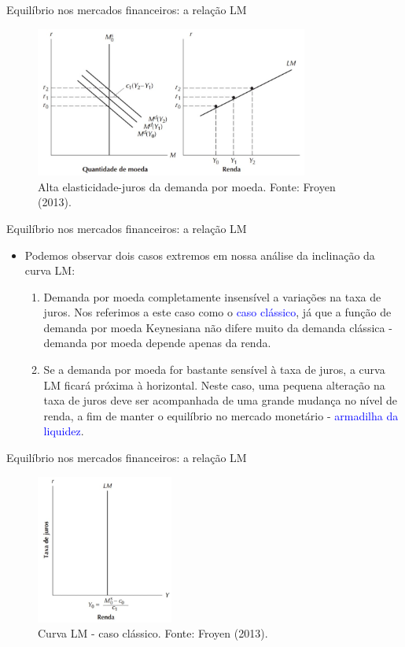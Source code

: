 \documentclass[10pt]{beamer}
\begin{document}
\begin{frame}{Equilíbrio nos mercados financeiros: a relação LM}
\begin{figure}
    \centering
    \includegraphics[width=0.8\textwidth]{./figures/aula092_fig5.JPG}
    \caption{Alta elasticidade-juros da demanda por moeda. Fonte: Froyen (2013).}
    \label{fig5}
\end{figure}
\end{frame}

\begin{frame}{Equilíbrio nos mercados financeiros: a relação LM}
\begin{itemize}
    \item Podemos observar dois casos extremos em nossa análise da inclinação da curva LM:
    \bigskip
    \begin{enumerate}
        \item Demanda por moeda completamente insensível a variações na taxa de juros. Nos referimos a este caso como o \textcolor{blue}{caso clássico}, já que a função de demanda por moeda Keynesiana não difere muito da demanda clássica - demanda por moeda depende apenas da renda.
        \bigskip
        \item Se a demanda por moeda for bastante sensível à taxa de juros, a curva LM ficará próxima à horizontal. Neste caso, uma pequena alteração na taxa de juros deve ser acompanhada de uma grande mudança no nível de renda, a fim de manter o equilíbrio no mercado monetário - \textcolor{blue}{armadilha da liquidez}.
    \end{enumerate}
\end{itemize}
\end{frame}

\begin{frame}{Equilíbrio nos mercados financeiros: a relação LM}
\begin{figure}
    \centering
    \includegraphics[width=0.4\textwidth]{./figures/aula092_fig6.JPG}
    \caption{Curva LM - caso clássico. Fonte: Froyen (2013).}
    \label{fig6}
\end{figure}
\end{frame}
\end{document}
